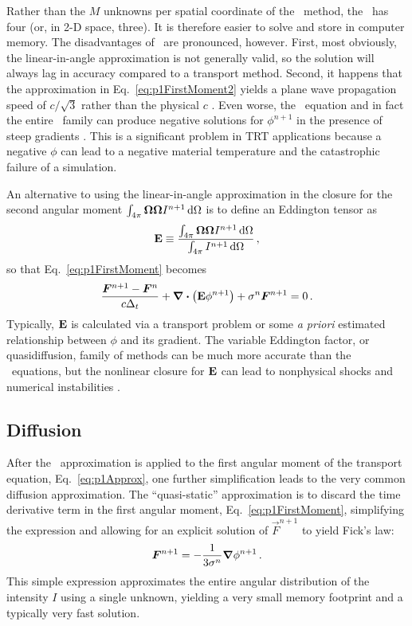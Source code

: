 Rather than the $M$ unknowns per spatial coordinate of the \SN\ method, the
\Pone\ has four (or, in 2-D space, three). It is therefore easier to solve and
store in computer memory. The disadvantages of \Pone\ are pronounced, however.
First, most obviously, the linear-in-angle approximation is not generally valid, so
the solution will
always lag in accuracy compared to a transport method. Second, it happens that
the approximation in Eq.~\eqref{eq:p1FirstMoment2} yields a plane wave
propagation speed of $c/\sqrt{3}$ rather than the physical $c$
\cite{Mih1984,War2002}. Even worse, the \Pone\ equation and in fact the entire
\PN\ family can produce negative solutions for $\phi^{n+1}$ in the presence of
steep gradients \cite{Bru2002,McC2007,McC2008a}. This is a significant problem
in TRT
applications because a negative $\phi$ can lead to a negative material
temperature and
the catastrophic failure of a simulation.

An alternative to using the linear-in-angle approximation in the closure for the
second angular moment
$\int_{4\pi} \bm{\Omega}\bm{\Omega} I^{n+1} \mathop{}\!\mathrm{d}\Omega$ is to define an
Eddington tensor \cite{Pom1982,Ols2000} as
\begin{equation*}
  \mathbf{E} \equiv \frac{\int_{4\pi} \bm{\Omega}\bm{\Omega} I^{n+1}
  \mathop{}\!\mathrm{d}\Omega}{\int_{4\pi} I^{n+1} \mathop{}\!\mathrm{d}\Omega}\,,
\end{equation*}
so that Eq.~\eqref{eq:p1FirstMoment} becomes
\begin{equation*}
  \frac{\bm{F}^{n+1} - \bm{F}^n }{c \Delta_t}
  + \bm{\nabla} \bm{\cdot} \left( \mathbf{E}\phi^{n+1} \right)
  + \sigma^n \bm{F}^{n+1}
  = 0\,.
\end{equation*}
Typically, $\mathbf{E}$ is calculated via a transport problem or some \emph{a
priori} estimated relationship between $\phi$ and its gradient.
The variable Eddington factor, or quasidiffusion, family of methods can be much
more accurate than the \Pone\ equations, but the nonlinear closure for $\mathbf{E}$
can lead to nonphysical shocks and numerical instabilities \cite{Ols2000}.

\subsection{Diffusion}\label{sec:bgDiffusion}

After the \Pone\ approximation is applied to the first angular moment of the
transport equation, Eq.~\eqref{eq:p1Approx}, one further simplification leads to
the very common diffusion approximation. The ``quasi-static'' \cite{Dud1976}
approximation is to discard the time derivative term in the first angular moment,
Eq.~\eqref{eq:p1FirstMoment}, simplifying the expression and allowing for an
explicit solution of $\vec{F}^{n+1}$ to yield Fick's law:
\begin{equation*}
  \bm{F}^{n+1} = - \frac{1}{3\sigma^n} \bm{\nabla} \phi^{n+1}\,.
\end{equation*}
This simple expression approximates the entire angular distribution of the
intensity $I$ using a single unknown, yielding a very small memory footprint and
a typically very fast solution.

